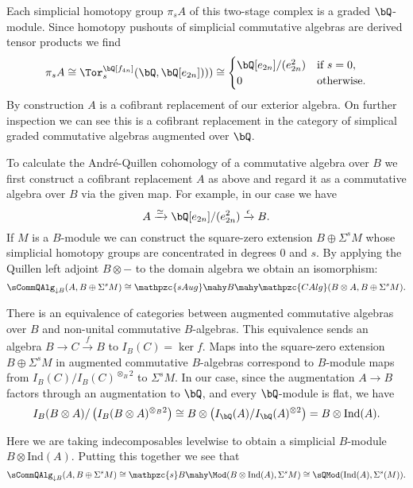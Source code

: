 \documentclass[leqno,oneside,english]{elsarticle}
\begin{document}
\begin{example}
  Each simplicial homotopy group $\pi_s A$ of this
  two-stage complex is a graded $\bQ$-module. Since homotopy pushouts
  of simplicial commutative algebras are derived tensor products we
  find 
  \[ 
  \pi_s A\cong \Tor^{\bQ[f_{4n}]}_s(\bQ, \bQ[e_{2n}]))) \cong 
  \begin{cases} 
    \bQ[e_{2n}]/(e_{2n}^2) & \mbox{if } s=0,\\
    0 & \mbox{otherwise.}
  \end{cases}
  \] 
  By construction $A$ is a cofibrant replacement of our exterior
  algebra. On further inspection we can see this is a cofibrant
  replacement in the category of simplical graded commutative algebras
  augmented over $\bQ$. 

  To calculate the Andr\'e-Quillen cohomology of a commutative
  algebra over $B$ we first construct a cofibrant replacement $A$ as
  above and regard it as a commutative algebra over $B$
  via the given map. For example, in our case we have 
  \[
  A\xrightarrow{\simeq } \bQ[e_{2n}]/(e_{2n}^2)\xrightarrow{\epsilon}
  B.
  \] 
  If $M$ is a $B$-module we can construct the square-zero extension
  $B\oplus \Sigma^s{M}$ whose simplicial homotopy groups are
  concentrated in degrees $0$ and $s$.  By applying the Quillen left
  adjoint $B\otimes-$ to the domain algebra we obtain an isomorphism:
  \[ 
  \sCommQAlg_{\downarrow B}(A, B\oplus \Sigma^s{M}) \cong
  \mathpzc{sAug} \mahy B \mahy \mathpzc{CAlg}(B\otimes A, B\oplus \Sigma^s{M}).
  \] 

  There is an equivalence of categories between augmented commutative
  algebras over $B$ and non-unital commutative $B$-algebras. This
  equivalence sends an algebra $B\rightarrow C\xrightarrow{f} B$ to
  $I_{B}(C)=\ker{f}$.  Maps into the square-zero extension
  $B\oplus \Sigma^s M$ in augmented commutative $B$-algebras 
  correspond to $B$-module maps from $I_B(C)/I_{B}(C)^{\otimes_B
    2}$ to $\Sigma^s M$. In our case, since the augmentation $A\rightarrow B$ factors through an augmentation to $\bQ$, and every $\bQ$-module is flat, we have
  \[
  I_B(B \otimes A)/\left(I_B(B \otimes A)^{\otimes_B 2}\right) \cong B\otimes\left( I_\bQ
  (A)/I_{\bQ}(A)^{\otimes 2}\right) = B\otimes {\mathrm{Ind}}(A).
  \] 
  
  
  
  
  
  
  Here we are taking indecomposables levelwise to obtain a simplicial
  $B$-module $B\otimes {\mathrm{Ind}}(A)$.   Putting this together we see that 
  \[
  \sCommQAlg_{\downarrow B}(A, B\oplus \Sigma^s{M}) \cong
  \mathpzc{s}B\mahy\Mod(B\otimes {\mathrm{Ind}}(A), \Sigma^s{M}) \cong 
  \sQMod({\mathrm{Ind}}(A), \Sigma^s(M)).
  \]


\end{example}
\end{document}
